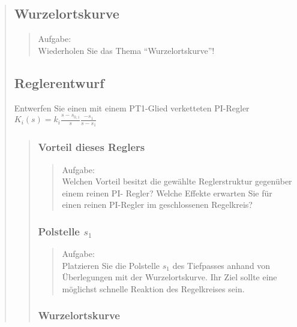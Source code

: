 \begin{quote}
\begin{quote}
        
	\end{quote}
	
	\subsection{Wurzelortskurve}
	\begin{quote}
		Aufgabe:\\
		Wiederholen Sie das Thema "`Wurzelortskurve"'!\\
		

    \end{quote}
    
    \subsection{Reglerentwurf}
    Entwerfen Sie einen mit einem PT1-Glied verketteten PI-Regler $K_i(s) = k_i \frac{s-s_{0,i}}{s} \frac{-s_1}{s-s_1}$
    \begin{quote}
        \subsubsection{Vorteil dieses Reglers}
            
        \begin{quote}
            Aufgabe:\\
            Welchen Vorteil besitzt die gewählte Reglerstruktur gegenüber einem reinen PI-
            Regler? Welche Effekte erwarten Sie für einen reinen PI-Regler im geschlossenen
            Regelkreis?\\
            
        \end{quote}


        \subsubsection{Polstelle $s_1$}
        \begin{quote}
            Aufgabe:\\
            Platzieren Sie die Polstelle $s_1$ des Tiefpasses anhand von Überlegungen mit der
            Wurzelortskurve. Ihr Ziel sollte eine möglichst schnelle Reaktion des Regelkreises
            sein.\\
            
        \end{quote}
        
        
        \subsubsection{Wurzelortskurve}


\end{quote}
\end{quote}
